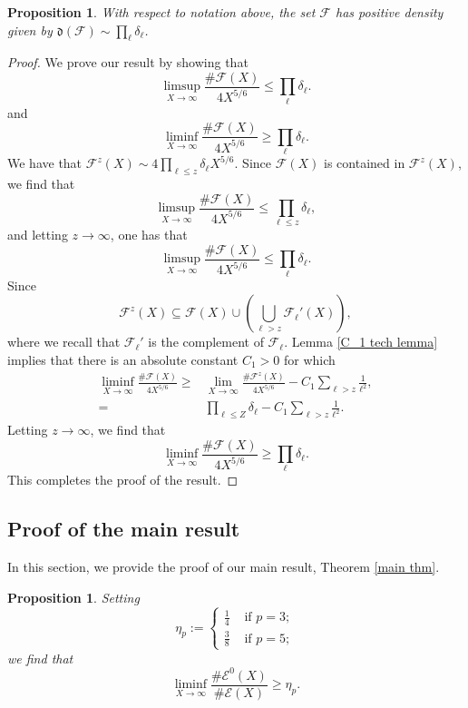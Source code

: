 \documentclass[12pt]{amsart}
\newtheorem{proposition}[theorem]{Proposition}
\newcommand{\cF}{\mathcal{F}}
\newcommand{\cE}{\mathcal{E}}
\numberwithin{equation}{section}
\begin{document}
\begin{proposition}\label{density of F is prod delta ell}
    With respect to notation above, the set $\cF$ has positive density given by $\mathfrak{d}(\cF)\sim \prod_{\ell} \delta_\ell$.
\end{proposition}
\begin{proof}
    We prove our result by showing that 
\begin{equation}\label{prop 4.15 eq 1}
    \limsup_{X\rightarrow \infty} \frac{\# \cF(X)}{4X^{5/6}}\leq \prod_{\ell} \delta_\ell.
    \end{equation}
    and 
    \begin{equation}\label{prop 4.15 eq 2}
    \liminf_{X\rightarrow \infty} \frac{\# \cF(X)}{4X^{5/6}}\geq \prod_{\ell} \delta_\ell.
    \end{equation}
We have that $\cF^z(X)\sim 4\prod_{\ell\leq z} \delta_\ell  X^{5/6}$. Since $\cF(X)$ is contained in $\cF^z(X)$, we find that 
     \[\limsup_{X\rightarrow \infty} \frac{\# \cF(X)}{4X^{5/6}}\leq \prod_{\ell\leq z} \delta_\ell,\]
     and letting $z\rightarrow \infty$, one has that
 \[\limsup_{X\rightarrow \infty} \frac{\# \cF(X)}{4X^{5/6}}\leq \prod_{\ell} \delta_\ell.\]
 Since \[\cF^z(X)\subseteq \cF(X)\cup \left(\bigcup_{\ell>z } \cF_\ell'(X)\right),\] where we recall that $\cF_\ell'$ is the complement of $\cF_\ell$. Lemma \ref{C_1 tech lemma} implies that there is an absolute constant $C_1>0$ for which
\[\begin{split}\liminf_{X\rightarrow \infty} \frac{\# \cF(X)}{4X^{5/6}}\geq & \lim_{X\rightarrow \infty} \frac{\# \cF^z(X)}{4X^{5/6}}-C_1 \sum_{\ell>z}\frac{1}{\ell^2},\\ = &\prod_{\ell \leq Z} \delta_\ell - C_1 \sum_{\ell>z}\frac{1}{\ell^2}. \end{split}\]
Letting $z\rightarrow \infty$, we find that 
\begin{equation}\label{liminf equation}\liminf_{X\rightarrow \infty} \frac{\# \cF(X)}{4 X^{5/6}}\geq \prod_{\ell} \delta_\ell.\end{equation}
This completes the proof of the result.
\end{proof}


 \subsection{Proof of the main result}
In this section, we provide the proof of our main result, Theorem \ref{main thm}.
\begin{proposition}\label{lower density of E0}
Setting \[\eta_p:=\begin{cases} \frac{1}{4} & \text{ if }p=3;\\
 \frac{3}{8} & \text{ if }p=5;\end{cases}\] we find that
    \[\liminf_{X\rightarrow \infty} \frac{\# \cE^0(X)}{\#\cE(X)}\geq \eta_p.\]
\end{proposition}
\end{document}
